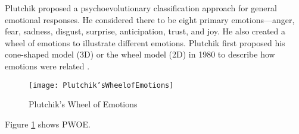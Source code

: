 Plutchik proposed a psychoevolutionary classification approach for general emotional responses. He considered there to be eight primary emotions—anger, fear, sadness, disgust, surprise, anticipation, trust, and joy.
He also created a wheel of emotions to illustrate different emotions. Plutchik first proposed his cone-shaped model (3D) or the wheel model (2D) in 1980 to describe how emotions were related \cite{enwiki:1136521972}.
\begin{figure}[H]
	\texttt{[image: Plutchik'sWheelofEmotions]}
	\caption{Plutchik's Wheel of Emotions}
	\label{Fig:fig}
\end{figure}
Figure \ref{Fig:fig} shows PWOE.